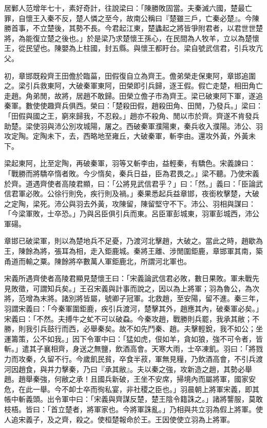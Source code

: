 \begin{pinyinscope}
居鄛人范增年七十，素好奇計，往說梁曰：「陳勝敗固當。夫秦滅六國，楚最亡罪，自懷王入秦不反，楚人憐之至今，故南公稱曰『楚雖三戶，亡秦必楚』。今陳勝首事，不立楚後，其勢不長。今君起江東，楚蠭起之將皆爭附君者，以君世世楚將，為能復立楚之後也。」於是梁乃求楚懷王孫心，在民間為人牧羊，立以為楚懷王，從民望也。陳嬰為上柱國，封五縣。與懷王都盱台。梁自號武信君，引兵攻亢父。

初，章邯既殺齊王田儋於臨菑，田假復自立為齊王。儋弟榮走保東阿，章邯追圍之。梁引兵救東阿，大破秦軍東阿，田榮即引兵歸，逐王假。假亡走楚，相田角亡走趙。角弟閒，故將，居趙不敢歸。田榮立儋子市為齊王。梁已破東阿下軍，遂追秦軍。數使使趣齊兵俱西。榮曰：「楚殺田假，趙殺田角、田閒，乃發兵。」梁曰：「田假與國之王，窮來歸我，不忍殺。」趙亦不殺角、閒以市於齊。齊遂不肯發兵助楚。梁使羽與沛公別攻城陽，屠之。西破秦軍濮陽東，秦兵收入濮陽。沛公、羽攻定陶。定陶未下，去，西略地至雍丘，大破秦軍，斬李由。還攻外黃，外黃未下。

梁起東阿，比至定陶，再破秦軍，羽等又斬李由，益輕秦，有驕色。宋義諫曰：「戰勝而將驕卒惰者敗。今少惰矣，秦兵日益，臣為君畏之。」梁不聽。乃使宋義於齊。道遇齊使者高陵君顯，曰：「公將見武信君乎？」曰：「然。」義曰：「臣論武信君軍必敗。公徐行則免，疾行則及禍。」秦果悉起兵益章邯，夜銜枚擊楚，大破之定陶，梁死。沛公與羽去外黃，攻陳留，陳留堅守不下。沛公、羽相與謀曰：「今梁軍敗，士卒恐。」乃與呂臣俱引兵而東。呂臣軍彭城東，羽軍彭城西，沛公軍碭。

章邯已破梁軍，則以為楚地兵不足憂，乃渡河北擊趙，大破之。當此之時，趙歇為王，陳餘為將，張耳為相，走入鉅鹿城。秦將王離、涉閒圍鉅鹿，章邯軍其南，築甬道而輸之粟。陳餘將卒數萬人軍鉅鹿北，所謂河北軍也。

宋義所遇齊使者高陵君顯見楚懷王曰：「宋義論武信君必敗，數日果敗。軍未戰先見敗徵，可謂知兵矣。」王召宋義與計事而說之，因以為上將軍；羽為魯公，為次將，范增為末將。諸別將皆屬，號卿子冠軍。北救趙，至安陽，留不進。秦三年，羽謂宋義曰：「今秦軍圍鉅鹿，疾引兵渡河，楚擊其外，趙應其內，破秦軍必矣。」宋義曰：「不然。夫搏牛之虻不可以破蝨。今秦攻趙，戰勝則兵罷，我承其敝；不勝，則我引兵鼓行而西，必舉秦矣。故不如先鬥秦、趙。夫擊輕銳，我不如公；坐運籌策，公不如我。」因下令軍中曰：「猛如虎，佷如羊，貪如狼，強不可令者，皆斬。」遣其子襄相齊，身送之無鹽，飲酒高會。天寒大雨，士卒凍飢。羽曰：「將戮力而攻秦，久留不行。今歲飢民貧，卒食半菽，軍無見糧，乃飲酒高會，不引兵渡河因趙食，與并力擊秦，乃曰『承其敝』。夫以秦之強，攻新造之趙，其勢必舉趙。趙舉秦強，何敝之承！且國兵新破，王坐不安席，掃境內而屬將軍，國家安危，在此一舉。今不卹士卒而徇私宴，非社稷之臣也。」羽晨朝上將軍宋義，即其帳中斬義頭。出令軍中曰：「宋義與齊謀反楚，楚王陰令籍誅之。」諸將讋服，莫敢枝梧。皆曰：「首立楚者，將軍家也。今將軍誅亂。」乃相與共立羽為假上將軍。使人追宋義子，及之齊，殺之。使桓楚報命於王。王因使使立羽為上將軍。


\end{pinyinscope}
